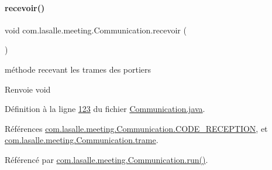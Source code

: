 \paragraph{\texorpdfstring{recevoir()}{recevoir()}}
{\footnotesize\ttfamily void com.\+lasalle.\+meeting.\+Communication.\+recevoir (\begin{DoxyParamCaption}{ }\end{DoxyParamCaption})}



méthode recevant les trames des portiers 

\begin{DoxyReturn}{Renvoie}
void 
\end{DoxyReturn}


Définition à la ligne \hyperlink{_communication_8java_source_l00123}{123} du fichier \hyperlink{_communication_8java_source}{Communication.\+java}.



Références \hyperlink{_communication_8java_source_l00032}{com.\+lasalle.\+meeting.\+Communication.\+C\+O\+D\+E\+\_\+\+R\+E\+C\+E\+P\+T\+I\+ON}, et \hyperlink{_communication_8java_source_l00040}{com.\+lasalle.\+meeting.\+Communication.\+trame}.



Référencé par \hyperlink{_communication_8java_source_l00247}{com.\+lasalle.\+meeting.\+Communication.\+run()}.


